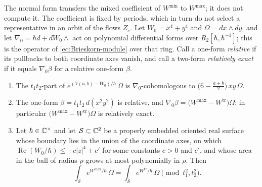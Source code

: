 The normal form transfers the mixed coefficient of $W^{\min}$ to $W^{\max}$;
it does not compute it.  The coefficient is fixed by periods,
which in turn do not select a representative in an orbit of the flows
$Z_c$.  Let
$W_0=x^4+y^4$ and $\Omega=dx\wedge dy$, and let $\nabla_0=\hbar d+dW_0\wedge$ act
on polynomial differential forms over $R_2[\hbar,\hbar^{-1}]$; this is the
operator of \eqref{eq:Brieskorn-module} over that ring.  Call a one-form \emph{relative} if its
pullbacks to both coordinate axes vanish, and call a two-form
\emph{relatively exact} if it equals $\nabla_0\beta$ for a relative one-form
$\beta$.

\begin{proposition}
\label{prop:relative-exact}
\begin{enumerate}
\item The $t_1t_2$-part of $e^{(V(a,b)-W_0)/\hbar}\,\Omega$ is
$\nabla_0$-cohomologous to $\bigl(6-\tfrac{a+b}2\bigr)\,xy\,\Omega$.
\item The one-form $\beta=t_1t_2\,d(x^2y^2)$ is relative, and
$\nabla_0\beta=\bigl(W^{\max}-W^{\mathrm{tr}}\bigr)\Omega$; in particular
$\bigl(W^{\max}-W^{\mathrm{tr}}\bigr)\Omega$ is relatively exact.
\item Let $\hbar\in\mathbb C^\times$ and let $\mathcal S\subset\mathbb C^2$ be a properly
embedded oriented real surface whose boundary lies in the union of the
coordinate axes, on which $\operatorname{Re}(W_0/\hbar)\leq -c|z|^4+c'$ for some constants $c>0$
and $c'$,
and whose area in the ball of radius $\rho$ grows at most polynomially in
$\rho$.  Then
\[
 \int_{\mathcal S} e^{W^{\max}/\hbar}\,\Omega
 =\int_{\mathcal S} e^{W^{\mathrm{tr}}/\hbar}\,\Omega
 \pmod{t_1^2,t_2^2}.
\]
\end{enumerate}
\end{proposition}

